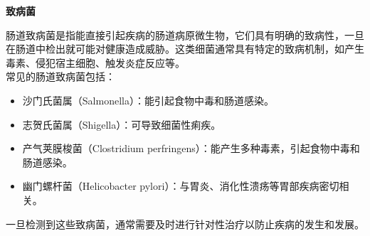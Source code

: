 \documentclass[UTF8]{ctexart}
\begin{document}
\newpage

\begin{tcolorbox}[
    enhanced,
    colback=white,
    colframe=white,
    arc=2mm,
    boxrule=0pt,
    width=\textwidth,
    left=15pt,
    right=15pt,
    top=10pt,
    bottom=10pt,
    drop shadow={
        opacity=0.2,
        color=customTeal
    },
    borderline west={5pt}{0pt}{customTeal}
]
\textcolor{customTeal}{\large\textbf{致病菌}}
\end{tcolorbox}

\begin{tcolorbox}[
    enhanced,
    colback=customTealBg,
    colframe=customTealBg,
    arc=3mm,
    boxrule=0pt,
    width=\textwidth,
    top=8pt,
    bottom=8pt
]
{\small{\color{customTeal}\faInfoCircle}\quad 肠道致病菌是指能直接引起疾病的肠道病原微生物，它们具有明确的致病性，一旦在肠道中检出就可能对健康造成威胁。这类细菌通常具有特定的致病机制，如产生毒素、侵犯宿主细胞、触发炎症反应等。\\
\faCommentAlt
常见的肠道致病菌包括：
\begin{itemize}
    \item 沙门氏菌属（Salmonella）：能引起食物中毒和肠道感染。
    \item 志贺氏菌属（Shigella）：可导致细菌性痢疾。
    \item 产气荚膜梭菌（Clostridium perfringens）：能产生多种毒素，引起食物中毒和肠道感染。
    \item 幽门螺杆菌（Helicobacter pylori）：与胃炎、消化性溃疡等胃部疾病密切相关。
\end{itemize}
一旦检测到这些致病菌，通常需要及时进行针对性治疗以防止疾病的发生和发展。
}
\end{tcolorbox}

\newpage
\end{document}
